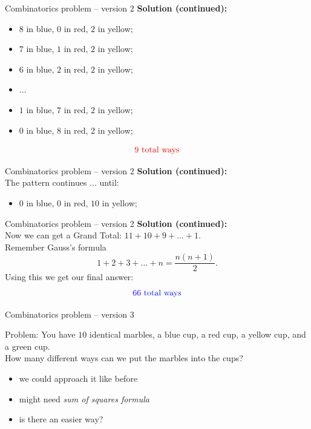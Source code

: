 \documentclass{beamer}
\begin{document}
\begin{frame}{Combinatorics problem -- version 2}
\textbf{Solution (continued):}\\
  \begin{itemize}
\pause
    \item $8$ in blue, $0$ in red, $2$ in yellow;
\pause
    \item $7$ in blue, $1$ in red, $2$ in yellow;
\pause
    \item $6$ in blue, $2$ in red, $2$ in yellow;
\pause
    \item $\dots$
\pause
    \item $1$ in blue, $7$ in red, $2$ in yellow;
\pause
    \item $0$ in blue, $8$ in red, $2$ in yellow;
  \end{itemize}
\pause
$$\text{{\color{red}9 total ways}}$$
\end{frame}

\begin{frame}{Combinatorics problem -- version 2}
\textbf{Solution (continued):}\\
\pause
The pattern continues ... until:
  \begin{itemize}
\pause
    \item $0$ in blue, $0$ in red, $10$ in yellow;
  \end{itemize}
\end{frame}

\begin{frame}{Combinatorics problem -- version 2}
\textbf{Solution (continued):}\\
\pause
Now we can get a {\color{blue}Grand Total:} $11+10+9 +\dots + 1$.\\
\pause
Remember Gauss's formula
$$1 + 2 + 3 + \dots + n = \frac{n(n+1)}{2}.$$
\pause
Using this we get our final answer:
$$\text{{\color{blue}66 total ways}}$$
\end{frame}

\begin{frame}{Combinatorics problem -- version 3}
\pause
  \begin{block}{Problem:}
\pause
    You have $10$ identical marbles, a blue cup, a red cup, a yellow cup, and a green cup.\\
\pause
    How many different ways can we put the marbles into the cups?
  \end{block}
  \begin{itemize}
\pause
    \item we could approach it like before
\pause
    \item might need \emph{sum of squares formula}
\pause
    \item is there an {\color{red}easier way}?
  \end{itemize}
\end{frame}
\end{document}
